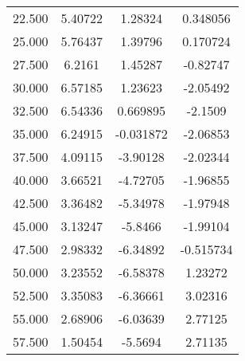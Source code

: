 \documentclass[]{article}
\begin{document}
\begin{table}[H]
\begin{center}
\begin{tabular}{cccc}
			\footnotesize 22.500 & \footnotesize 5.40722 & \footnotesize 1.28324 & \footnotesize 0.348056 \\
			
			\footnotesize 25.000 & \footnotesize 5.76437 & \footnotesize 1.39796 & \footnotesize 0.170724 \\
			
			\footnotesize 27.500 & \footnotesize 6.2161 & \footnotesize 1.45287 & \footnotesize -0.82747 \\
			
			\footnotesize 30.000 & \footnotesize 6.57185 & \footnotesize 1.23623 & \footnotesize -2.05492 \\
			
			\footnotesize 32.500 & \footnotesize 6.54336 & \footnotesize 0.669895 & \footnotesize -2.1509 \\
			
			\footnotesize 35.000 & \footnotesize 6.24915 & \footnotesize -0.031872 & \footnotesize -2.06853 \\
			
			\footnotesize 37.500 & \footnotesize 4.09115 & \footnotesize -3.90128 & \footnotesize -2.02344 \\
			
			\footnotesize 40.000 & \footnotesize 3.66521 & \footnotesize -4.72705 & \footnotesize -1.96855 \\
			
			\footnotesize 42.500 & \footnotesize 3.36482 & \footnotesize -5.34978 & \footnotesize -1.97948 \\
			
			\footnotesize 45.000 & \footnotesize 3.13247 & \footnotesize -5.8466 & \footnotesize -1.99104 \\
			
			\footnotesize 47.500 & \footnotesize 2.98332 & \footnotesize -6.34892 & \footnotesize -0.515734 \\
			
			\footnotesize 50.000 & \footnotesize 3.23552 & \footnotesize -6.58378 & \footnotesize 1.23272 \\
			
			\footnotesize 52.500 & \footnotesize 3.35083 & \footnotesize -6.36661 & \footnotesize 3.02316 \\
			
			\footnotesize 55.000 & \footnotesize 2.68906 & \footnotesize -6.03639 & \footnotesize 2.77125 \\
			
			\footnotesize 57.500 & \footnotesize 1.50454 & \footnotesize -5.5694 & \footnotesize 2.71135 \\
			

\end{tabular}
\end{center}
\end{table}
\end{document}
